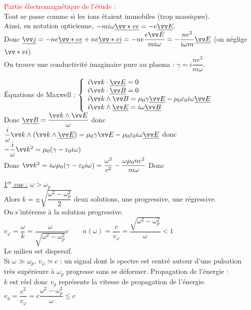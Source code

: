 \documentclass[a4paper]{article}
\begin{document}
\textcolor{red}{Partie électromagnétique de l'étude :}\\
Tout se passe comme si les ions étaient immobiles (trop massiques).\\
Ainsi, en notation opticienne, $-mi\omega \underline{\vv*ve}=-e \underline{\vv E}$. \\
Donc $\underline{\vv j}=-ne\underline{\vv*ve}+ne\underline{\vv*vi}=-ne \dfrac{e\vv E}{mi\omega}=-\dfrac{ne^2}{i\omega m}\underline{\vv E}$ (on néglige $\vv*vi$)\\
On trouve une conductivité imaginaire pure au plasma : $\underline{\gamma}=i \dfrac{ne^2}{m\omega}$.\par
Équations de Maxwell : 
\(\left\{
    \begin{array}{ll}
        i\vv k\cdot \underline{\vv E}=0\\
        i\vv k\cdot \underline{\vv B}=0\\
        i\vv k\wedge\vv B=\mu_0\gamma\underline{\vv E}-\mu_0\varepsilon_0 i\omega \underline{\vv E}\\
        i\vv k\wedge \underline{\vv E}=i\omega \underline{\vv B}\\
    \end{array}
\right.\)\\
Donc $\underline{\vv B}=\dfrac{\vv k\wedge\vv E}{\omega}$ donc $\dfrac{i}{\omega}\vv k\wedge(\vv k\wedge\underline{\vv E})=\mu_0\gamma\vv E-\mu_0\varepsilon_0 i\omega\underline{\vv E}$ donc $-\dfrac{i}{\omega}\vv k^2=\mu_0(\gamma-\varepsilon_0 i\omega)$\\
Donc $\vv k^2=i\omega\mu_0(\gamma-\varepsilon_0 i\omega)=\dfrac{\omega^2}{c^2}-\dfrac{\omega\mu_0ne^2}{m\omega}$
Donc\\
\begin{center}\end{center}

\underline{1$^{\mathrm{er}}$ cas :} $\omega>\omega_p$\\
Alors $k=\pm \sqrt{\dfrac{\omega^2-\omega_p^2}{2}}$ deux solutions, une progressive, une régressive.\\
On s'intéresse à la solution progressive.\\
$v_\varphi=\dfrac{\omega}{k}=\dfrac{\omega}{\sqrt{\omega^2-\omega_p^2}}c\qquad n(\omega)=\dfrac{c}{v_\varphi}=\dfrac{\sqrt{\omega^2-\omega_p^2}}{\omega}<1$\\
Le milieu est dispersif.\\
Si $\omega\gg\omega_p$, $v_\varphi\simeq c$ : un signal dont le spectre est centré autour d'une pulsation très supérieure à $\omega_p$ progresse sans se déformer.\newpage
Propagation de l'énergie :\\
$k$ est réel donc $v_g$ représente la vitesse de propagation de l'énergie.\\
$v_g=\dfrac{c^2}{v_\varphi}=c \dfrac{\omega^2-\omega_p^2}{\omega} \leqslant c$
\end{document}
